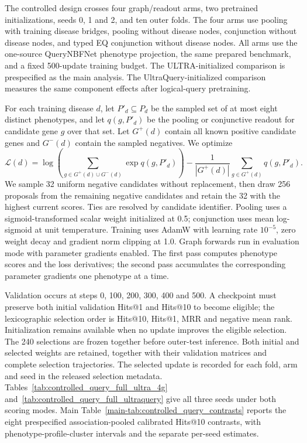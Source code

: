 \documentclass{article}
\begin{document}
The controlled design crosses four graph/readout arms, two pretrained
initializations, seeds 0, 1 and 2, and ten outer folds. The four arms use pooling
with training disease bridges, pooling without disease nodes, conjunction
without disease nodes, and typed EQ conjunction without disease nodes.
All arms use the one-source QueryNBFNet phenotype projection, the same prepared
benchmark, and a fixed 500-update training budget. The ULTRA-initialized comparison
is prespecified as the main analysis. The UltraQuery-initialized comparison
measures the same component effects after logical-query pretraining.

For each training disease $d$, let $P'_d\subseteq P_d$ be the sampled set of at
most eight distinct phenotypes, and let $q(g,P'_d)$ be the pooling or conjunctive
readout for candidate gene $g$ over that set. Let $G^+(d)$ contain all known
positive candidate genes and $G^-(d)$ contain the sampled negatives. We optimize
\begin{equation}
\mathcal{L}(d)=
\log\!\left(\sum_{g\in G^+(d)\cup G^-(d)}\exp q(g,P'_d)\right)
-\frac{1}{|G^+(d)|}\sum_{g\in G^+(d)}q(g,P'_d).
\end{equation}
We sample 32 uniform negative candidates without replacement, then draw 256
proposals from the remaining negative candidates and retain the 32 with the
highest current scores. Ties are resolved by candidate identifier. Pooling uses
a sigmoid-transformed scalar weight initialized at 0.5; conjunction uses mean
log-sigmoid at unit temperature. Training uses AdamW with learning rate $10^{-5}$,
zero weight decay and gradient norm clipping at 1.0. Graph forwards run in
evaluation mode with parameter gradients enabled. The first pass computes
phenotype scores and the loss derivatives; the second pass accumulates the
corresponding parameter gradients one phenotype at a time.

Validation occurs at steps 0, 100, 200, 300, 400 and 500. A checkpoint must
preserve both initial validation Hits@1 and Hits@10 to become eligible; the
lexicographic selection order is Hits@10, Hits@1, MRR and negative mean rank.
Initialization remains available when no update improves the eligible selection.
The 240 selections are frozen together before outer-test inference. Both initial
and selected weights are retained, together with their validation matrices and
complete selection trajectories. The selected update is recorded for each fold,
arm and seed in the released selection metadata.
Tables~\ref{tab:controlled_query_full_ultra_4g}
and~\ref{tab:controlled_query_full_ultraquery} give all three seeds under both
scoring modes. Main Table~\ref{main-tab:controlled_query_contrasts} reports the
eight prespecified association-pooled calibrated Hits@10 contrasts, with
phenotype-profile-cluster intervals and the separate per-seed estimates.
\end{document}
